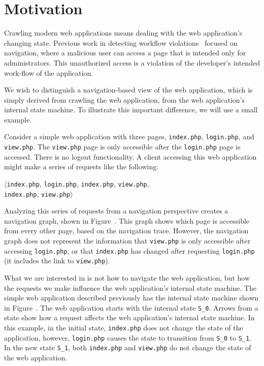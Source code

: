 \section{Motivation}



Crawling modern web applications means dealing with the web application's
changing state. Previous work in detecting workflow
violations~\cite{balzarotti07:mimosa,li11:BLOCK,cova07:swaddler,felmetsger10:logic}
focused on navigation, where a malicious user can access a page that is
intended only for administrators. This unauthorized access is a violation of
the developer's intended work-flow of the application.

We wish to distinguish a navigation-based view of the web application, which is
simply derived from crawling the web application, from the web application's
internal state machine. To illustrate this important difference, we will use a small
example.

Consider a simple web application with three pages,
\texttt{index.php}, \texttt{login.php}, and \texttt{view.php}. The
\texttt{view.php} page is only accessible after the \texttt{login.php} page is
accessed. There is no logout functionality. A client accessing this web
application might make a series of requests like the following:

\noindent{}$\langle$\texttt{index.php}, \texttt{login.php}, \texttt{index.php},
\texttt{view.php}, \\
\phantom{$\langle$}\texttt{index.php}, \texttt{view.php}$\rangle$

Analyzing this series of requests from a navigation perspective creates a
navigation graph, shown in Figure~. This graph shows
which page is accessible from every other page, based on the navigation trace.
However, the navigation graph does not represent the information that
\texttt{view.php} is only accessible after accessing \texttt{login.php}, or
that \texttt{index.php} has changed after requesting \texttt{login.php} (it
includes the link to \texttt{view.php}).

What we are interested in is not how to navigate the web application, but how
the requests we make influence the web application's internal state machine.
The simple web application described previously has the internal state machine shown
in Figure~. The web application starts with the internal
state \texttt{S\_0}. Arrows from a state show how a request affects the web
application's internal state machine. In this example, in the initial state,
\texttt{index.php} does not change the state of the application, however,
\texttt{login.php} causes the state to transition from \texttt{S\_0} to
\texttt{S\_1}. In the new state \texttt{S\_1}, both \texttt{index.php} and
\texttt{view.php} do not change the state of the web application.

